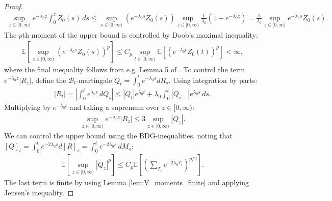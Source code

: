 \documentclass{article}
\numberwithin{equation}{section}
\begin{document}
\begin{proof}
    \begin{align*}
        \sup_{z\in [0,\infty)}e^{-\lambda_0 z}\int_0^z Z_0(s)\,ds\leq \sup_{s\in [0,\infty)}(e^{-\lambda_0 s}Z_0(s))\sup_{z\in [0,\infty)}\frac{1}{\lambda_0}(1-e^{-\lambda_0 z})=\frac{1}{\lambda_0}\sup_{z\in [0,\infty)}e^{-\lambda_0 s}Z_0(s). 
    \end{align*}
The $p$th moment of the upper bound is controlled by Doob's maximal inequality:
    \begin{align*}
        \mathbb{E}\left[\sup_{z\in [0,\infty)}\left(e^{-\lambda_0 s}Z_0(s)\right)^p\right]\leq C_p\sup_{t\in [0,\infty)}\mathbb{E}[\left(e^{-\lambda_0 t}Z_0(t)\right)^p]<\infty,
    \end{align*}
    where the final inequality follows from e.g. Lemma 5 of \cite{foo2014escape}.
To control the term $e^{-\lambda_0 z}|R_z|$, define the $\mathcal{B}_t$-martingale $Q_t=\int_0^t e^{-\lambda_0 s}dR_s$. Using integration by parts:
    \begin{align*}
        |R_t|=\left|\int_0^t e^{\lambda_0 s}\,dQ_s\right|\leq |Q_t|e^{\lambda_0 t}+\lambda_0 \int_0^t \left|Q_{s-}\right|e^{\lambda_0 s}\,ds.
    \end{align*}
    Multiplying by $e^{-\lambda_0 t}$ and taking a supremum over $z\in [0,\infty)$:
    \begin{align*}
        \sup_{z\in [0,\infty)} e^{-\lambda_0 z}|R_z|\leq 3\sup_{z\in [0,\infty)}|Q_z|.
    \end{align*}
    We can control the upper bound using the BDG-inequalities, noting that $[Q]_t=\int_0^t e^{-2\lambda_0 s}d[R]_s=\int_0^t e^{-2\lambda_0 s}\,dM_s$:
    \begin{align*}
        \mathbb{E}[\sup_{z\in [0,\infty)}|Q_z|^p]\leq C_p \mathbb{E}\left[\left(\sum_{T_i}e^{-2\lambda_0 T_i}\right)^{p/2}\right].
    \end{align*}
    The last term is finite by using Lemma \ref{lem:V_moments_finite} and applying Jensen's inequality.
    

\end{proof}
\end{document}
